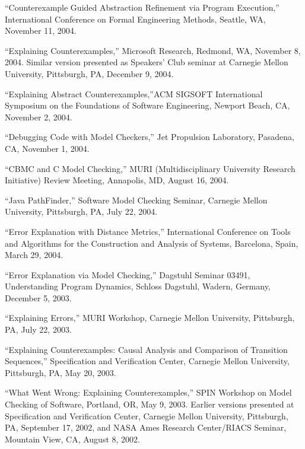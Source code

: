 \documentclass[ComputerScience]{vita}
\begin{document}
\begin{vita}
\begin{Selected Presentations}
  \item ``Counterexample Guided Abstraction Refinement via Program Execution,'' International Conference on Formal Engineering Methods, Seattle, WA, November 11, 2004.

  \item ``Explaining Counterexamples,'' Microsoft Research, Redmond, WA, November 8, 2004.  Similar version presented as Speakers' Club seminar at Carnegie Mellon University, Pittsburgh, PA, December 9, 2004.

  \item ``Explaining Abstract Counterexamples,''ACM SIGSOFT International Symposium on the Foundations of Software Engineering, Newport Beach, CA, November 2, 2004.

  \item ``Debugging Code with Model Checkers,'' Jet Propulsion Laboratory, Pasadena, CA, November 1, 2004.

  \item ``CBMC and C Model Checking,'' MURI (Multidisciplinary University Research Initiative) Review Meeting, Annapolis, MD, August 16, 2004.

  \item ``Java PathFinder,'' Software Model Checking Seminar, Carnegie Mellon University, Pittsburgh, PA, July 22, 2004.

  \item ``Error Explanation with Distance Metrics,'' International Conference on Tools and Algorithms for the Construction and Analysis of Systems, Barcelona, Spain, March 29, 2004.  


  \item ``Error Explanation via Model Checking,''  Dagstuhl Seminar 03491, Understanding Program Dynamics, Schloss Dagstuhl, Wadern, Germany, December 5, 2003.

  \item ``Explaining Errors,'' MURI Workshop, Carnegie Mellon University, Pittsburgh, PA, July 22, 2003.

  \item ``Explaining Counterexamples: Causal Analysis and Comparison of Transition Sequences,''  Specification and Verification Center, Carnegie Mellon University, Pittsburgh, PA, May 20, 2003.

  \item ``What Went Wrong: Explaining Counterexamples,''  SPIN Workshop on Model Checking of Software, Portland, OR, May 9, 2003.  Earlier versions presented at Specification and Verification Center, Carnegie Mellon University, Pittsburgh, PA, September 17, 2002, and NASA Ames Research Center/RIACS Seminar, Mountain View, CA, August 8, 2002.


\end{Selected Presentations}
\end{vita}
\end{document}
